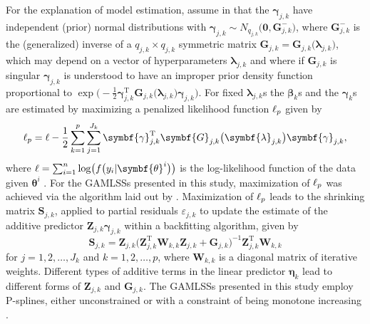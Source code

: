 For the explanation of model estimation, assume in  that the \(\symbf{\gamma}_{j, k}\) have independent (prior) normal distributions with \(\symbf{\gamma}_{j, k} \sim N_{q_{j, k}}\bigl(\symbf{0}, \symbf{G}_{j, k}^-\bigr)\), where \(\symbf{G}_{j, k}^-\) is the (generalized) inverse of a \(q_{j, k} \times q_{j, k}\) symmetric matrix \(\symbf{G}_{j, k} = \symbf{G}_{j, k}\bigl(\symbf{\lambda}_{j, k}\bigr)\), which may depend on a vector of hyperparameters \(\symbf{\lambda}_{j, k}\) and where if \(\symbf{G}_{j, k}\) is singular \(\symbf{\gamma}_{j, k}\) is understood to have an improper prior density function proportional to \(\exp\bigl(-\frac{1}{2} \symbf{\gamma}_{j, k}^{\text{T}} \symbf{G}_{j, k}\bigl(\symbf{\lambda}_{j, k}\bigr) \symbf{\gamma}_{j, k}\bigr)\).  For fixed \(\symbf{\lambda}_{j, k}\)s the \(\symbf{\beta}_k\)s and the \(\symbf{\gamma}_k\)s are estimated by maximizing a penalized likelihood function \(\ell_p\) given by
\begin{equation}
  \label{eq:GAMLSSRigbyStasinopoulos2005PenalizedLikelihood}
  \loglikelihood_p = \loglikelihood - \frac{1}{2} \sum_{k = 1}^p \sum_{j = 1}^{J_k} \symbf{\gamma}_{j, k}^{\text{T}} \symbf{G}_{j, k}\bigl(\symbf{\lambda}_{j, k}\bigr) \symbf{\gamma}_{j, k},
\end{equation}
where \(\loglikelihood = \sum_{i = 1}^n \log\bigl(f\bigl(y_i | \symbf{\theta}^i\bigr)\bigr)\) is the log-likelihood function of the data given \(\symbf{\theta}^i\) \parencite{Rigby2005}.  For the GAMLSSs presented in this study, maximization of \(\ell_p\) was achieved via the algorithm laid out by \textcite{Rigby1996}.  Maximization of \(\ell_p\) leads to the shrinking matrix \(\symbf{S}_{j, k}\), applied to partial residuals \(\varepsilon_{j, k}\) to update the estimate of the additive predictor \(\symbf{Z}_{j, k} \symbf{\gamma}_{j, k}\) within a backfitting algorithm, given by
\begin{equation}
  \label{eq:GAMLSSRigbyStasinopoulos2005BackfittingAlgorithm}
  \symbf{S}_{j, k} = \symbf{Z}_{j, k} \bigl(\symbf{Z}_{j, k}^{\text{T}} \symbf{W}_{k, k} \symbf{Z}_{j, k} + \symbf{G}_{j, k}\bigr)^{-1} \symbf{Z}_{j, k}^{\text{T}} \symbf{W}_{k, k}
\end{equation}
for \(j = 1, 2, \ldots, J_k\) and \(k = 1, 2, \ldots, p\), where \(\symbf{W}_{k, k}\) is a diagonal matrix of iterative weights.  Different types of additive terms in the linear predictor \(\symbf{\eta}_k\) lead to different forms of \(\symbf{Z}_{j, k}\) and \(\symbf{G}_{j, k}\).  The GAMLSSs presented in this study employ P-splines, either unconstrained \parencite{Eilers1996} or with a constraint of being monotone increasing \parencite{Bollaerts2006}.  %

